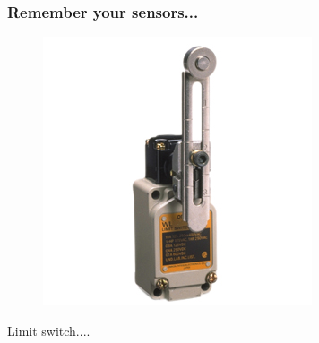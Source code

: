 \documentclass[compress]{beamer}
\begin{document}
\begin{frame}
  \frametitle{Remember your sensors...}
  \begin{figure}
    \includegraphics[width=0.4\linewidth]{limit.jpg}
  \end{figure}     
  \begin{center}
    Limit switch.... 
  \end{center}
\end{frame}
\end{document}
